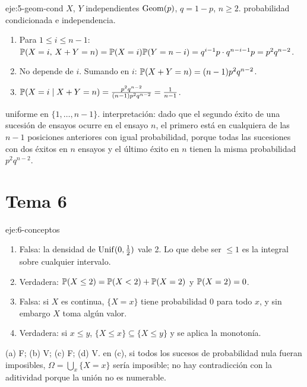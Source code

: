 \begin{solucion}{eje:5-geom-cond}
\datos $X$, $Y$ independientes $\operatorname{Geom}(p)$, $q=1-p$, $n\ge2$.
\planteamiento probabilidad condicionada e independencia.
\pasos
\begin{enumerate}[label=\arabic*.]
  \item Para $1\le i\le n-1$: $\mathbb{P}(X=i,\,X+Y=n)=\mathbb{P}(X=i)\mathbb{P}(Y=n-i)=q^{i-1}p\cdot q^{n-i-1}p=p^{2}q^{n-2}$.
  \item No depende de $i$. Sumando en $i$: $\mathbb{P}(X+Y=n)=(n-1)p^{2}q^{n-2}$.
  \item $\mathbb{P}(X=i\mid X+Y=n)=\frac{p^{2}q^{n-2}}{(n-1)p^{2}q^{n-2}}=\frac1{n-1}$.
\end{enumerate}
\resultado uniforme en $\{1,\dots,n-1\}$.
\comprobacion interpretación: dado que el segundo éxito de una sucesión de ensayos ocurre en el ensayo $n$, el primero está en cualquiera de las $n-1$ posiciones anteriores con igual probabilidad, porque todas las sucesiones con dos éxitos en $n$ ensayos y el último éxito en $n$ tienen la misma probabilidad $p^{2}q^{n-2}$.
\end{solucion}

\section{Tema 6}

\begin{solucion}{eje:6-conceptos}
\pasos
\begin{enumerate}[label=(\alph*)]
  \item Falsa: la densidad de $\operatorname{Unif}(0,\tfrac12)$ vale 2. Lo que debe ser $\le1$ es la integral sobre cualquier intervalo.
  \item Verdadera: $\mathbb{P}(X\le2)=\mathbb{P}(X<2)+\mathbb{P}(X=2)$ y $\mathbb{P}(X=2)=0$.
  \item Falsa: si $X$ es continua, $\{X=x\}$ tiene probabilidad 0 para todo $x$, y sin embargo $X$ toma algún valor.
  \item Verdadera: si $x\le y$, $\{X\le x\}\subseteq\{X\le y\}$ y se aplica la monotonía.
\end{enumerate}
\resultado (a) F; (b) V; (c) F; (d) V.
\comprobacion en (c), si todos los sucesos de probabilidad nula fueran imposibles, $\Omega=\bigcup_x\{X=x\}$ sería imposible; no hay contradicción con la aditividad porque la unión no es numerable.
\end{solucion}

